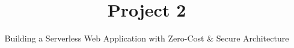 \documentclass[english]{reportDoCS2025}
\title{Project 2}
\subtitle{Building a Serverless Web Application with Zero-Cost \& Secure Architecture}
\begin{document}
\cover

\contents
\listImages
% 



% 
% 




% 

\end{document}
